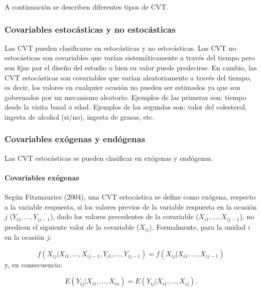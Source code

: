 \documentclass[spanish]{article}
\numberwithin{figure}{subsection}
\numberwithin{equation}{subsection}
\numberwithin{table}{subsection}
\begin{document}
A continuación se describen diferentes tipos de CVT.

\subsubsection{Covariables estocásticas y no estocásticas}

Las CVT pueden clasificarse en estocásticas y no estocásticas. Las CVT no
estocásticas son covariables que varían sistemáticamente a través del tiempo
pero son fijas por el diseño del estudio o bien su valor puede predecirse. En
cambio, las CVT estocásticas son covariables que varían aleatoriamente a través
del tiempo, es decir, los valores en cualquier ocasión no pueden ser estimados
ya que son gobernados por un mecanismo aleatorio. Ejemplos de las primeras son:
tiempo desde la visita basal o edad. Ejemplos de las segundas son: valor del
colesterol, ingesta de alcohol (si/no), ingesta de grasas, etc.

\subsubsection{Covariables exógenas y endógenas}
\label{seccion_de_exogeneidad}

Las CVT estocásticas se pueden clasificar en exógenas y endógenas.

\paragraph{Covariables exógenas} \mbox{}

Según Fitzmaurice (2004), una CVT estocástica se define como exógena, respecto a
la variable respuesta, si los valores previos de la variable respuesta en la
ocasión $j$ ($Y_{i1}, ..., Y_{ij-1}$), dado los valores precedentes de la
covariable ($X_{i1}, ..., X_{ij-1}$), no predicen el siguiente valor de la
covariable ($X_{ij}$). Formalmente, para la unidad $i$ en la ocasión $j$:  

\begin{equation}
	\label{exogeneidad}
	f(X_{ij}|X_{i1}, ..., X_{ij-1}, Y_{i1}, ..., Y_{ij-1}) =
	f(X_{ij}|X_{i1}, ..., X_{ij-1})
\end{equation}
y, en consecuencia:

\begin{equation}
	\label{exogeneidad debil}
	E(Y_{ij}|X_{i1}, ..., X_{in}) = E(Y_{ij}|X_{i1}, ..., X_{ij}).
\end{equation}
\end{document}
